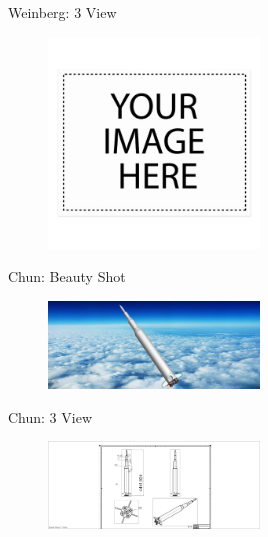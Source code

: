 \documentclass[10pt]{beamer}
\begin{document}
\begin{frame}{Weinberg: 3 View}
\begin{figure}
\centering
\includegraphics[width=0.5\textwidth]{Weinberg_3_View.png}
\end{figure}
\end{frame}

	\begin{frame}{Chun: Beauty Shot}
\begin{figure}
	\centering
	\includegraphics[width=0.5\textwidth]{Chun_Beauty.png}
\end{figure}
\end{frame}

\begin{frame}{Chun: 3 View}
\begin{figure}
\centering
\includegraphics[width=0.5\textwidth]{Chun_3_View.png}
\end{figure}
\end{frame}
\end{document}
